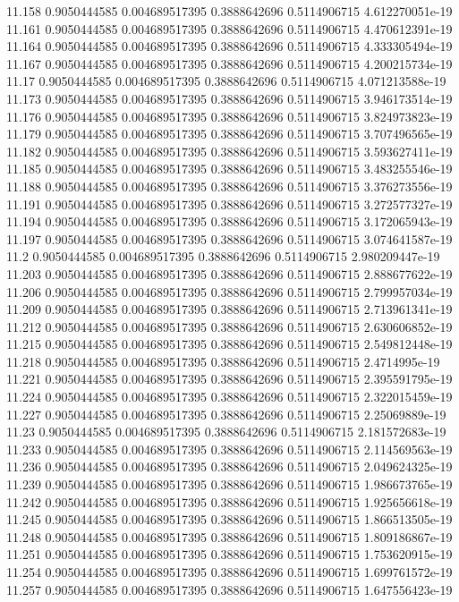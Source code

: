 {11.158 0.9050444585 0.004689517395 0.3888642696 0.5114906715 4.612270051e-19
11.161 0.9050444585 0.004689517395 0.3888642696 0.5114906715 4.470612391e-19
11.164 0.9050444585 0.004689517395 0.3888642696 0.5114906715 4.333305494e-19
11.167 0.9050444585 0.004689517395 0.3888642696 0.5114906715 4.200215734e-19
11.17 0.9050444585 0.004689517395 0.3888642696 0.5114906715 4.071213588e-19
11.173 0.9050444585 0.004689517395 0.3888642696 0.5114906715 3.946173514e-19
11.176 0.9050444585 0.004689517395 0.3888642696 0.5114906715 3.824973823e-19
11.179 0.9050444585 0.004689517395 0.3888642696 0.5114906715 3.707496565e-19
11.182 0.9050444585 0.004689517395 0.3888642696 0.5114906715 3.593627411e-19
11.185 0.9050444585 0.004689517395 0.3888642696 0.5114906715 3.483255546e-19
11.188 0.9050444585 0.004689517395 0.3888642696 0.5114906715 3.376273556e-19
11.191 0.9050444585 0.004689517395 0.3888642696 0.5114906715 3.272577327e-19
11.194 0.9050444585 0.004689517395 0.3888642696 0.5114906715 3.172065943e-19
11.197 0.9050444585 0.004689517395 0.3888642696 0.5114906715 3.074641587e-19
11.2 0.9050444585 0.004689517395 0.3888642696 0.5114906715 2.980209447e-19
11.203 0.9050444585 0.004689517395 0.3888642696 0.5114906715 2.888677622e-19
11.206 0.9050444585 0.004689517395 0.3888642696 0.5114906715 2.799957034e-19
11.209 0.9050444585 0.004689517395 0.3888642696 0.5114906715 2.713961341e-19
11.212 0.9050444585 0.004689517395 0.3888642696 0.5114906715 2.630606852e-19
11.215 0.9050444585 0.004689517395 0.3888642696 0.5114906715 2.549812448e-19
11.218 0.9050444585 0.004689517395 0.3888642696 0.5114906715 2.4714995e-19
11.221 0.9050444585 0.004689517395 0.3888642696 0.5114906715 2.395591795e-19
11.224 0.9050444585 0.004689517395 0.3888642696 0.5114906715 2.322015459e-19
11.227 0.9050444585 0.004689517395 0.3888642696 0.5114906715 2.25069889e-19
11.23 0.9050444585 0.004689517395 0.3888642696 0.5114906715 2.181572683e-19
11.233 0.9050444585 0.004689517395 0.3888642696 0.5114906715 2.114569563e-19
11.236 0.9050444585 0.004689517395 0.3888642696 0.5114906715 2.049624325e-19
11.239 0.9050444585 0.004689517395 0.3888642696 0.5114906715 1.986673765e-19
11.242 0.9050444585 0.004689517395 0.3888642696 0.5114906715 1.925656618e-19
11.245 0.9050444585 0.004689517395 0.3888642696 0.5114906715 1.866513505e-19
11.248 0.9050444585 0.004689517395 0.3888642696 0.5114906715 1.809186867e-19
11.251 0.9050444585 0.004689517395 0.3888642696 0.5114906715 1.753620915e-19
11.254 0.9050444585 0.004689517395 0.3888642696 0.5114906715 1.699761572e-19
11.257 0.9050444585 0.004689517395 0.3888642696 0.5114906715 1.647556423e-19
}
